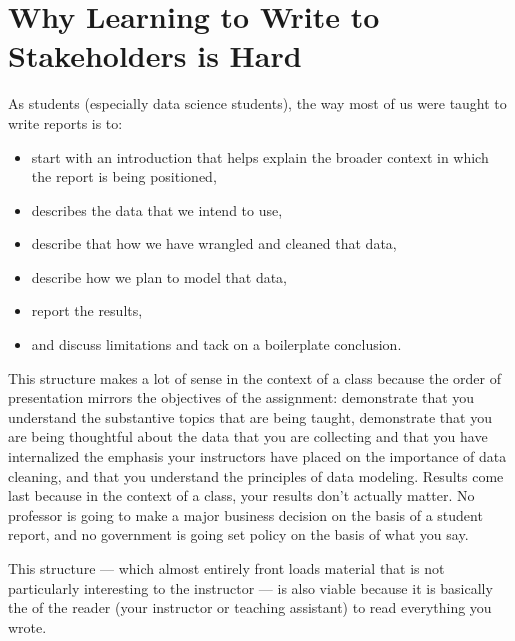 \documentclass[letterpaper,10pt,english]{jupyterBook}
\begin{document}
\section{Why Learning to Write to Stakeholders is Hard}
\label{\detokenize{40_in_practice/25_writing_to_stakeholders:why-learning-to-write-to-stakeholders-is-hard}}
\sphinxAtStartPar
As students (especially data science students), the way most of us were taught to write reports is to:
\begin{itemize}
\item {} 
\sphinxAtStartPar
start with an introduction that helps explain the broader context in which the report is being positioned,

\item {} 
\sphinxAtStartPar
describes the data that we intend to use,

\item {} 
\sphinxAtStartPar
describe that how we have wrangled and cleaned that data,

\item {} 
\sphinxAtStartPar
describe how we plan to model that data,

\item {} 
\sphinxAtStartPar
report the results,

\item {} 
\sphinxAtStartPar
and discuss limitations and tack on a boilerplate conclusion.

\end{itemize}

\sphinxAtStartPar
This structure makes a lot of sense in the context of a class because the order of presentation mirrors the objectives of the assignment: demonstrate that you understand the substantive topics that are being taught, demonstrate that you are being thoughtful about the data that you are collecting and that you have internalized the emphasis your instructors have placed on the importance of data cleaning, and that you understand the principles of data modeling. Results come last because in the context of a class, your results don’t actually matter. No professor is going to make a major business decision on the basis of a student report, and no government is going set policy on the basis of what you say.

\sphinxAtStartPar
This structure — which almost entirely front loads material that is not particularly interesting to the instructor — is also viable because it is basically the  of the reader (your instructor or teaching assistant) to read everything you wrote.
\end{document}
